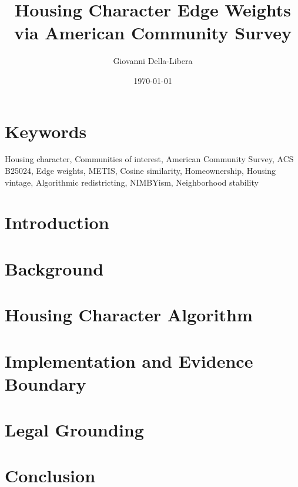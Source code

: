 \documentclass[12pt]{article}
\title{\textbf{Housing Character Edge Weights via American Community Survey}}
\author{Giovanni Della-Libera}
\date{\today}
\begin{document}
\maketitle

\begin{abstract}

\end{abstract}

\section*{Keywords}
Housing character, Communities of interest, American Community Survey, ACS B25024,
Edge weights, METIS, Cosine similarity, Homeownership, Housing vintage,
Algorithmic redistricting, NIMBYism, Neighborhood stability

\section{Introduction}


\section{Background}


\section{Housing Character Algorithm}


\section{Implementation and Evidence Boundary}


\section{Legal Grounding}


\section{Conclusion}




\end{document}
